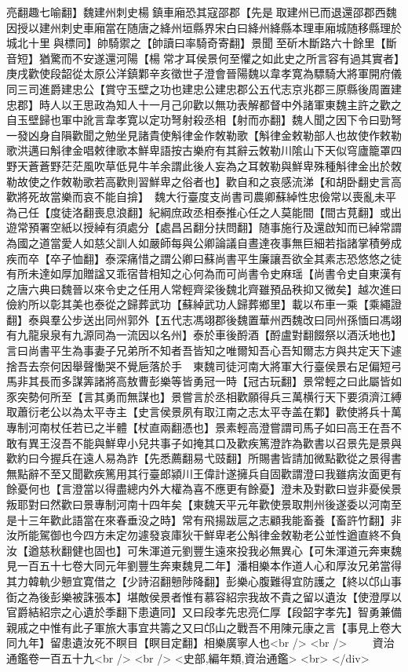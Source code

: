 亮翻趣七喻翻】魏建州刺史楊鎮車廂恐其寇邵郡【先是取建州已而退還邵郡西魏因授以建州刺史車廂當在随唐之絳州垣縣界宋白曰絳州絳縣本理車廂城随移縣理於城北十里與標同】帥騎禦之【帥讀曰率騎奇寄翻】景聞至斫木斷路六十餘里【斷音短】猶驚而不安遂還河陽【楊常才耳侯景何至懼之如此史之所言容有過其實者】庚戌歡使段韶從太原公洋鎮鄴辛亥徵世子澄會晉陽魏以韋孝寛為驃騎大將軍開府儀同三司進爵建忠公【賞守玉壁之功也建忠公建忠郡公五代志京兆郡三原縣後周置建忠郡】時人以王思政為知人十一月己卯歡以無功表解都督中外諸軍東魏主許之歡之自玉壁歸也軍中訛言韋孝寛以定功弩射殺丞相【射而亦翻】魏人聞之因下令曰勁弩一發凶身自隕歡聞之勉坐見諸貴使斛律金作敇勒歌【斛律金敕勒部人也故使作敕勒歌洪邁曰斛律金唱敕律歌本鮮卑語按古樂府有其辭云敇勒川隂山下天似穹廬籠罩四野天蒼蒼野茫茫風吹草低見牛羊余謂此後人妄為之耳敇勒與鮮卑殊種斛律金出於敇勒故使之作敇勒歌若高歡則習鮮卑之俗者也】歡自和之哀感流涕【和胡卧翻史言高歡將死故當樂而哀不能自揜】　魏大行臺度支尚書司農卿蘇綽性忠儉常以喪亂未平為己任【度徒洛翻喪息浪翻】紀綱庶政丞相泰推心任之人莫能間【間古莧翻】或出遊常預署空紙以授綽有須處分【處昌呂翻分扶問翻】随事施行及還啟知而已綽常謂為國之道當愛人如慈父訓人如嚴師每與公卿論議自晝達夜事無巨細若指諸掌積勞成疾而卒【卒子恤翻】泰深痛惜之謂公卿曰蘇尚書平生廉讓吾欲全其素志恐悠悠之徒有所未達如厚加贈諡又乖宿昔相知之心何為而可尚書令史麻瑶【尚書令史自東漢有之唐六典曰魏晉以來令史之任用人常輕齊梁後魏北齊雖預品秩抑又微矣】越次進曰儉約所以彰其美也泰從之歸葬武功【蘇綽武功人歸葬鄉里】載以布車一乘【乘繩證翻】泰與羣公步送出同州郭外【五代志馮翊郡後魏置華州西魏改曰同州孫愐曰馮翊有九龍泉泉有九源同為一流因以名州】泰於車後酹酒【酹盧對翻餟祭以酒沃地也】言曰尚書平生為事妻子兄弟所不知者吾皆知之唯爾知吾心吾知爾志方與共定天下遽捨吾去奈何因舉聲慟哭不覺巵落於手　東魏司徒河南大將軍大行臺侯景右足偏短弓馬非其長而多謀筭諸將高敖曹彭樂等皆勇冠一時【冠古玩翻】景常輕之曰此屬皆如豕突勢何所至【言其勇而無謀也】景嘗言於丞相歡願得兵三萬横行天下要須濟江縛取蕭衍老公以為太平寺主【史言侯景夙有取江南之志太平寺盖在鄴】歡使將兵十萬專制河南杖任若已之半體【杖直兩翻憑也】景素輕高澄嘗謂司馬子如曰高王在吾不敢有異王沒吾不能與鮮卑小兒共事子如掩其口及歡疾篤澄詐為歡書以召景先是景與歡約曰今握兵在遠人易為詐【先悉薦翻易弋豉翻】所賜書皆請加微點歡從之景得書無點辭不至又聞歡疾篤用其行臺郎潁川王偉計遂擁兵自固歡謂澄曰我雖病汝面更有餘憂何也【言澄當以得盡總内外大權為喜不應更有餘憂】澄未及對歡曰豈非憂侯景叛耶對曰然歡曰景專制河南十四年矣【東魏天平元年歡使景取荆州後遂委以河南至是十三年歡此語當在來春垂没之時】常有飛揚跋扈之志顧我能畜養【畜許竹翻】非汝所能駕御也今四方未定勿遽發哀庫狄干鮮卑老公斛律金敇勒老公並性遒直終不負汝【遒慈秋翻健也固也】可朱渾道元劉豐生遠來投我必無異心【可朱渾道元奔東魏見一百五十七卷大同元年劉豐生奔東魏見二年】潘相樂本作道人心和厚汝兄弟當得其力韓軌少戅宜寛借之【少詩沼翻戅陟降翻】彭樂心腹難得宜防護之【終以邙山事衘之為後彭樂被誅張本】堪敵侯景者惟有慕容紹宗我故不貴之留以遺汝【使澄厚以官爵結紹宗之心遺於季翻下患遺同】又曰段孝先忠亮仁厚【段韶字孝先】智勇兼備親戚之中惟有此子軍旅大事宜共籌之又曰邙山之戰吾不用陳元康之言【事見上卷大同九年】留患遺汝死不瞑目【瞑目定翻】相樂廣寧人也<br />
<br />
　　資治通鑑卷一百五十九<br />
<br />
<史部,編年類,資治通鑑>  <br>
   </div> 

